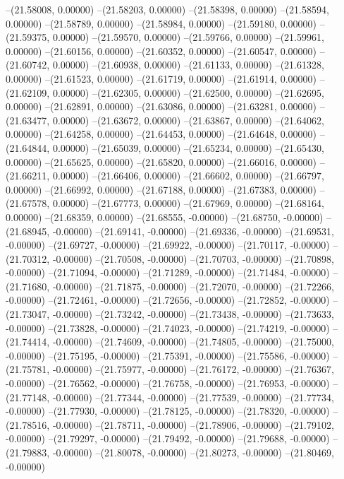--(21.58008, 0.00000)
--(21.58203, 0.00000)
--(21.58398, 0.00000)
--(21.58594, 0.00000)
--(21.58789, 0.00000)
--(21.58984, 0.00000)
--(21.59180, 0.00000)
--(21.59375, 0.00000)
--(21.59570, 0.00000)
--(21.59766, 0.00000)
--(21.59961, 0.00000)
--(21.60156, 0.00000)
--(21.60352, 0.00000)
--(21.60547, 0.00000)
--(21.60742, 0.00000)
--(21.60938, 0.00000)
--(21.61133, 0.00000)
--(21.61328, 0.00000)
--(21.61523, 0.00000)
--(21.61719, 0.00000)
--(21.61914, 0.00000)
--(21.62109, 0.00000)
--(21.62305, 0.00000)
--(21.62500, 0.00000)
--(21.62695, 0.00000)
--(21.62891, 0.00000)
--(21.63086, 0.00000)
--(21.63281, 0.00000)
--(21.63477, 0.00000)
--(21.63672, 0.00000)
--(21.63867, 0.00000)
--(21.64062, 0.00000)
--(21.64258, 0.00000)
--(21.64453, 0.00000)
--(21.64648, 0.00000)
--(21.64844, 0.00000)
--(21.65039, 0.00000)
--(21.65234, 0.00000)
--(21.65430, 0.00000)
--(21.65625, 0.00000)
--(21.65820, 0.00000)
--(21.66016, 0.00000)
--(21.66211, 0.00000)
--(21.66406, 0.00000)
--(21.66602, 0.00000)
--(21.66797, 0.00000)
--(21.66992, 0.00000)
--(21.67188, 0.00000)
--(21.67383, 0.00000)
--(21.67578, 0.00000)
--(21.67773, 0.00000)
--(21.67969, 0.00000)
--(21.68164, 0.00000)
--(21.68359, 0.00000)
--(21.68555, -0.00000)
--(21.68750, -0.00000)
--(21.68945, -0.00000)
--(21.69141, -0.00000)
--(21.69336, -0.00000)
--(21.69531, -0.00000)
--(21.69727, -0.00000)
--(21.69922, -0.00000)
--(21.70117, -0.00000)
--(21.70312, -0.00000)
--(21.70508, -0.00000)
--(21.70703, -0.00000)
--(21.70898, -0.00000)
--(21.71094, -0.00000)
--(21.71289, -0.00000)
--(21.71484, -0.00000)
--(21.71680, -0.00000)
--(21.71875, -0.00000)
--(21.72070, -0.00000)
--(21.72266, -0.00000)
--(21.72461, -0.00000)
--(21.72656, -0.00000)
--(21.72852, -0.00000)
--(21.73047, -0.00000)
--(21.73242, -0.00000)
--(21.73438, -0.00000)
--(21.73633, -0.00000)
--(21.73828, -0.00000)
--(21.74023, -0.00000)
--(21.74219, -0.00000)
--(21.74414, -0.00000)
--(21.74609, -0.00000)
--(21.74805, -0.00000)
--(21.75000, -0.00000)
--(21.75195, -0.00000)
--(21.75391, -0.00000)
--(21.75586, -0.00000)
--(21.75781, -0.00000)
--(21.75977, -0.00000)
--(21.76172, -0.00000)
--(21.76367, -0.00000)
--(21.76562, -0.00000)
--(21.76758, -0.00000)
--(21.76953, -0.00000)
--(21.77148, -0.00000)
--(21.77344, -0.00000)
--(21.77539, -0.00000)
--(21.77734, -0.00000)
--(21.77930, -0.00000)
--(21.78125, -0.00000)
--(21.78320, -0.00000)
--(21.78516, -0.00000)
--(21.78711, -0.00000)
--(21.78906, -0.00000)
--(21.79102, -0.00000)
--(21.79297, -0.00000)
--(21.79492, -0.00000)
--(21.79688, -0.00000)
--(21.79883, -0.00000)
--(21.80078, -0.00000)
--(21.80273, -0.00000)
--(21.80469, -0.00000)
